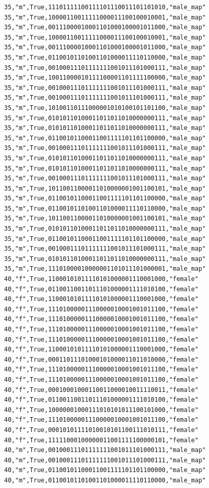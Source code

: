 \documentclass[authoryearcitations]{UoYCSproject}
\begin{document}
\begin{framed}
\begin{verbatim}
35,"m",True,11101111100111101110011101101010,"male_map"
35,"m",True,10000110011111000011100100010001,"male_map"
35,"m",True,00111000010001101000100001011000,"male_map"
35,"m",True,10000110011111000011100100010001,"male_map"
35,"m",True,00111000010001101000100001011000,"male_map"
35,"m",True,01100101101001101000011110110000,"male_map"
35,"m",True,00100011101111111001011101000111,"male_map"
35,"m",True,10011000010111100001101111100000,"male_map"
35,"m",True,00100011101111111001011101000111,"male_map"
35,"m",True,00100011101111111001011101000111,"male_map"
35,"m",True,10100110111000001010100101101100,"male_map"
35,"m",True,01010110100011011011010000000111,"male_map"
35,"m",True,01010110100011011011010000000111,"male_map"
35,"m",True,01100101100011001111101101100000,"male_map"
35,"m",True,00100011101111111001011101000111,"male_map"
35,"m",True,01010110100011011011010000000111,"male_map"
35,"m",True,01010110100011011011010000000111,"male_map"
35,"m",True,00100011101111111001011101000111,"male_map"
35,"m",True,10110011000011010000001001100101,"male_map"
35,"m",True,01100101100011001111101101100000,"male_map"
35,"m",True,01100101101001101000011110110000,"male_map"
35,"m",True,10110011000011010000001001100101,"male_map"
35,"m",True,01010110100011011011010000000111,"male_map"
35,"m",True,01100101100011001111101101100000,"male_map"
35,"m",True,00100011101111111001011101000111,"male_map"
35,"m",True,01010110100011011011010000000111,"male_map"
35,"m",True,11101000010000001101011101000001,"male_map"
40,"f",True,11000101011110101000001110001000,"female"
40,"f",True,01100110011011101000001111010100,"female"
40,"f",True,11000101011110101000001110001000,"female"
40,"f",True,11101000001110000010001001011100,"female"
40,"f",True,11101000001110000010001001011100,"female"
40,"f",True,11101000001110000010001001011100,"female"
40,"f",True,11101000001110000010001001011100,"female"
40,"f",True,11000101011110101000001110001000,"female"
40,"f",True,00011011101000101000011011010000,"female"
40,"f",True,11101000001110000010001001011100,"female"
40,"f",True,11101000001110000010001001011100,"female"
40,"f",True,00010001000110011000010011110011,"female"
40,"f",True,01100110011011101000001111010100,"female"
40,"f",True,10000001000111010101011100101000,"female"
40,"f",True,11101000001110000010001001011100,"female"
40,"f",True,00010101111010010101100111010111,"female"
40,"f",True,11111000100000011001111100000101,"female"
40,"m",True,00100011101111111001011101000111,"male_map"
40,"m",True,00100011101111111001011101000111,"male_map"
40,"m",True,01100101100011001111101101100000,"male_map"
40,"m",True,01100101101001101000011110110000,"male_map"

\end{verbatim}
\end{framed}
\end{document}
